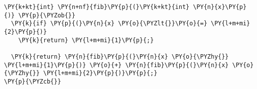 \begin{Verbatim}[commandchars=\\\{\}]
\PY{k+kt}{int} \PY{n+nf}{fib}\PY{p}{(}\PY{k+kt}{int} \PY{n}{x}\PY{p}{)} \PY{p}{\PYZob{}}
  \PY{k}{if} \PY{p}{(}\PY{n}{x} \PY{o}{\PYZlt{}}\PY{o}{=} \PY{l+m+mi}{2}\PY{p}{)}
    \PY{k}{return} \PY{l+m+mi}{1}\PY{p}{;}

  \PY{k}{return} \PY{n}{fib}\PY{p}{(}\PY{n}{x} \PY{o}{\PYZhy{}} \PY{l+m+mi}{1}\PY{p}{)} \PY{o}{+} \PY{n}{fib}\PY{p}{(}\PY{n}{x} \PY{o}{\PYZhy{}} \PY{l+m+mi}{2}\PY{p}{)}\PY{p}{;}
\PY{p}{\PYZcb{}}
\end{Verbatim}
